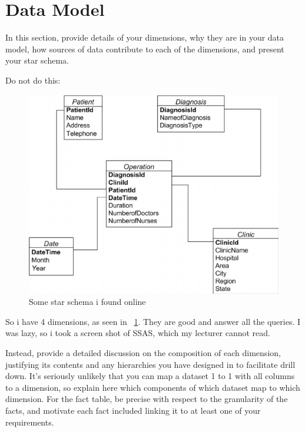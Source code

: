 \section{Data Model}
\label{sec:dataModel}

In this section, provide details of your dimensions, why they are in your data model, how sources of data contribute to each of the dimensions, and present your star schema. 

Do not do this:

\begin{figure}[ht]
\includegraphics[scale=\textwidth]{figures/sampleStar.png}
\caption{Some star schema i found online}
\label{fig:star}
\end{figure}

So i have 4 dimensions, as seen in \figurename~\ref{fig:star}. They are good and answer all the queries. I was lazy, so i took a screen shot of SSAS, which my lecturer cannot read.

Instead, provide a detailed discussion on the composition of each dimension, justifying its contents and any hierarchies you have designed in to facilitate drill down. It's seriously unlikely that you can map a dataset 1 to 1 with all columns to a dimension, so explain here which components of which dataset map to which dimension. For the fact table, be precise with respect to the granularity of the facts, and motivate each fact included linking it to at least one of your requirements.